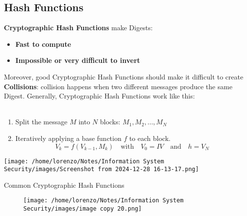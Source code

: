 \subsection{Hash Functions}
\textbf{Cryptographic Hash Functions} make Digests:
\begin{itemize}
    \item \textbf{Fast to compute}
    \item \textbf{Impossible or very difficult to invert}
\end{itemize}
Moreover, good Cryptographic Hash Functions should make it difficult to create  \textbf{Collisions}: collision happens when two different messages produce the same Digest.
Generally, Cryptographic Hash Functions work like this:
\\
\\
\begin{minipage}{0.6\textwidth}
	\vspace{-0.8cm}
\begin{enumerate}
    \item Split the message $M$ into $N$ blocks: $M_1, M_2, \dots, M_N$
    \item Iteratively applying a base function $f$ to each block.
    \[
    V_k = f(V_{k-1}, M_k) \quad \text{with} \quad V_0 = IV \quad \text{and} \quad h = V_N
    \]
\end{enumerate} 
\end{minipage} 
\hspace{0cm}
\begin{minipage}{0.4\textwidth}
    \centering
    \texttt{[image: /home/lorenzo/Notes/Information System Security/images/Screenshot from 2024-12-28 16-13-17.png]}
\end{minipage}

\begin{quotebox-grey}{Common Cryptographic Hash Functions}
    \begin{figure}[H]
        \centering
        \texttt{[image: /home/lorenzo/Notes/Information System Security/images/image copy 20.png]}
    \end{figure}
\end{quotebox-grey}

